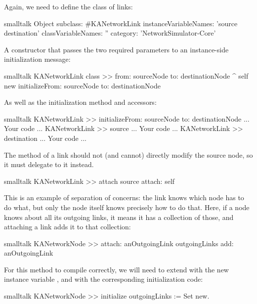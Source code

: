 \documentclass[10pt,twoside,english]{_support/latex/sbabook/sbabook}
\begin{document}
Again, we need to define the class of links:

\begin{displaycode}{smalltalk}
Object subclass: #KANetworkLink
    instanceVariableNames: 'source destination'
    classVariableNames: ''
    category: 'NetworkSimulator-Core'
\end{displaycode}

A constructor that passes the two required parameters to an instance-side initialization message:

\begin{displaycode}{smalltalk}
KANetworkLink class >> from: sourceNode to: destinationNode
    ^ self new
        initializeFrom: sourceNode to: destinationNode
\end{displaycode}

As well as the initialization method and accessors:

\begin{displaycode}{smalltalk}
KANetworkLink >> initializeFrom: sourceNode to: destinationNode
	... Your code ...
KANetworkLink >> source
	... Your code ...
KANetworkLink >> destination
	... Your code ...
\end{displaycode}

The  method of a link should not (and cannot) directly modify the source node, so it must delegate to it instead.

\begin{displaycode}{smalltalk}
KANetworkLink >> attach
    source attach: self
\end{displaycode}

This is an example of separation of concerns: the link knows which node has to do what, but only the node itself knows precisely how to do that.
Here, if a node knows about all its outgoing links, it means it has a collection of those, and attaching a link adds it to that collection:

\begin{displaycode}{smalltalk}
KANetworkNode >> attach: anOutgoingLink
    outgoingLinks add: anOutgoingLink
\end{displaycode}

For this method to compile correctly, we will need to extend  with the new instance variable , and with the corresponding initialization code:

\begin{displaycode}{smalltalk}
KANetworkNode >> initialize
    outgoingLinks := Set new.
\end{displaycode}
\end{document}

